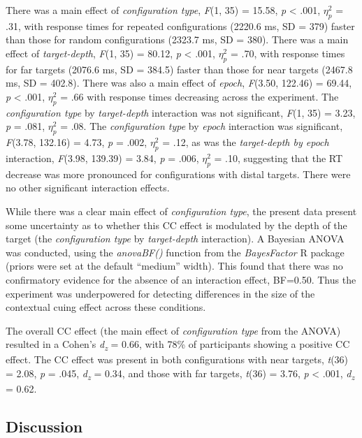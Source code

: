 \documentclass[
  english,
  man,floatsintext]{apa7}
\begin{document}
There was a main effect of \emph{configuration type}, \emph{F}(1, 35) = 15.58, \emph{p} \textless{} .001, \(\eta^2_p\) = .31, with response times for repeated configurations (2220.6 ms, SD = 379) faster than those for random configurations (2323.7 ms, SD = 380). There was a main effect of \emph{target-depth}, \emph{F}(1, 35) = 80.12, \emph{p} \textless{} .001, \(\eta^2_p\) = .70, with response times for far targets (2076.6 ms, SD = 384.5) faster than those for near targets (2467.8 ms, SD = 402.8). There was also a main effect of \emph{epoch}, \emph{F}(3.50, 122.46) = 69.44, \emph{p} \textless{} .001, \(\eta^2_p\) = .66 with response times decreasing across the experiment. The \emph{configuration type} by \emph{target-depth} interaction was not significant, \emph{F}(1, 35) = 3.23, \emph{p} = .081, \(\eta^2_p\) = .08. The \emph{configuration type} by \emph{epoch} interaction was significant, \emph{F}(3.78, 132.16) = 4.73, \emph{p} = .002, \(\eta^2_p\) = .12, as was the \emph{target-depth by epoch} interaction, \emph{F}(3.98, 139.39) = 3.84, \emph{p} = .006, \(\eta^2_p\) = .10, suggesting that the RT decrease was more pronounced for configurations with distal targets. There were no other significant interaction effects.

While there was a clear main effect of \emph{configuration type}, the present data present some uncertainty as to whether this CC effect is modulated by the depth of the target (the \emph{configuration type} by \emph{target-depth} interaction). A Bayesian ANOVA was conducted, using the \emph{anovaBF()} function from the \emph{BayesFactor} R package (priors were set at the default ``medium'' width). This found that there was no confirmatory evidence for the absence of an interaction effect, BF=0.50. Thus the experiment was underpowered for detecting differences in the size of the contextual cuing effect across these conditions.

The overall CC effect (the main effect of \emph{configuration type} from the ANOVA) resulted in a Cohen's \emph{d\textsubscript{z}} = 0.66, with 78\% of participants showing a positive CC effect. The CC effect was present in both configurations with near targets, \emph{t}(36) = 2.08, \emph{p} = .045, \emph{d\textsubscript{z}} = 0.34, and those with far targets, \emph{t}(36) = 3.76, \emph{p} \textless{} .001, \emph{d\textsubscript{z}} = 0.62.

\hypertarget{discussion}{%
\subsection{Discussion}\label{discussion}}
\end{document}
